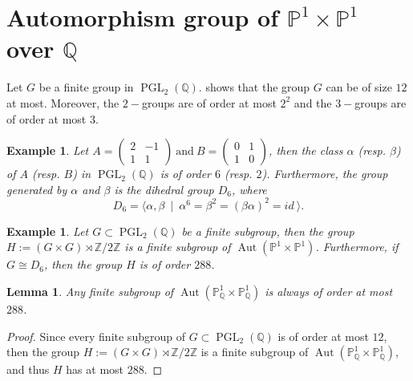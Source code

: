 \documentclass[leqno,12pt]{amsart} %
\newtheorem{lem}[thm]{Lemma}
\newtheorem{ex}[thm]{Example}
\newcommand{\Z}{\ensuremath{\mathbb{Z}}}
\newcommand{\Q}{\ensuremath{\mathbb{Q} }}
\newcommand{\p}{\ensuremath{\mathbb{P} }}
\DeclareMathOperator{\PGL}{PGL}
\DeclareMathOperator{\Aut}{Aut}
\begin{document}
  \section{\texorpdfstring{Automorphism group of $\p^1\times \p^1$ over $\Q$}{Automorphism group over Q}}
Let $G$ be a finite group in $\PGL _2(\Q )$. \cite[Theorem 4.2.]{MR2681719} shows that the group $G$ can be of size $12$ at most. Moreover, the $2-$groups are of order at most $2^2$ and the $3-$groups are of order at most $3$.
\begin{ex} \label{ex-04} Let $A=\left(\begin{matrix}
       2&-1  \\
          1& 1 
    \end{matrix}\right) \mathrm{~and~}B=\left(\begin{matrix}
       0&1  \\
          1& 0 
    \end{matrix}\right)$, then the class $\alpha$ (resp. $\beta$) of $A$ (resp. $B$) in $\PGL _2(\Q )$ is of order $6$ (resp. $2$). Furthermore, the group generated by $\alpha$ and $\beta$ is the dihedral group $D_6$, where
 \[D_6=\langle\alpha,\beta~\mid ~\alpha^6=\beta^2=(\beta\alpha)^2=id~\rangle.\]
\end{ex}
 
\begin{ex}\label{ex-03}\cite{MR2681719}
Let $G\subset\PGL_2(\Q)$ be a finite subgroup, then the group $H:=(G\times G)\rtimes\Z/2\Z$ is a finite subgroup of $\Aut(\p^1\times \p^1)$. Furthermore, if $G\cong D_6$, then the group $H$ is of order  $288$.
\end{ex}
 \begin{lem}\label{lemm-27}
     Any finite subgroup of $\Aut(\p^1_{\Q}\times \p^1_{\Q})$ is always of order at most $288$.
 \end{lem}
\begin{proof}
    Since every finite subgroup of $G\subset\PGL_2(\Q)$ is of order at most $12$, then the group $H:=(G\times G)\rtimes\Z/2\Z$ is a finite subgroup of $\Aut(\p^1_{\Q}\times \p^1_{\Q})$, and thus $H$ has at most $288$.
\end{proof}
\end{document}
